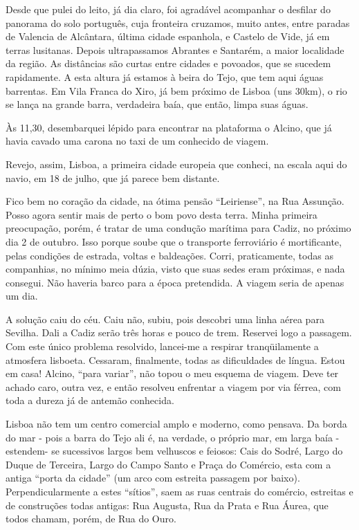 Desde que pulei do leito, já dia claro, foi agradável acompanhar o desfilar do panorama do solo português, cuja fronteira cruzamos, muito antes, entre paradas de Valencia de Alcântara, última cidade espanhola, e Castelo de Vide, já em terras lusitanas. Depois ultrapassamos Abrantes e Santarém, a maior localidade da região. As distâncias são curtas entre cidades e povoados, que se sucedem rapidamente. A esta altura já estamos à beira do Tejo, que tem aqui águas barrentas. Em Vila Franca do Xiro, já bem próximo de Lisboa (uns 30km), o rio se lança na grande barra, verdadeira baía, que então, limpa suas águas.

Às 11,30, desembarquei lépido para encontrar na plataforma o Alcino, que já havia cavado uma carona no taxi de um conhecido de viagem.

Revejo, assim, Lisboa, a primeira cidade europeia que conheci, na escala aqui do navio, em 18 de julho, que já parece bem distante.

Fico bem no coração da cidade, na ótima pensão “Leiriense”, na Rua Assunção. Posso agora sentir mais de perto o bom povo desta terra. Minha primeira preocupação, porém, é tratar de uma condução marítima para Cadiz, no próximo dia 2 de outubro. Isso porque soube que o transporte ferroviário é mortificante, pelas condições de estrada, voltas e baldeações. Corri, praticamente, todas as companhias, no mínimo meia dúzia, visto que suas sedes eram próximas, e nada consegui. Não haveria barco para a época pretendida. A viagem seria de apenas um dia.

A solução caiu do céu. Caiu não, subiu, pois descobri uma linha aérea para Sevilha. Dali a Cadiz serão três horas e pouco de trem. Reservei logo a passagem. Com este único problema resolvido, lancei-me a respirar tranqüilamente a atmosfera lisboeta. Cessaram, finalmente, todas as dificuldades de língua. Estou em casa! Alcino, “para variar”, não topou o meu esquema de viagem. Deve ter achado caro, outra vez, e então resolveu enfrentar a viagem por via férrea, com toda a dureza já de antemão conhecida.

Lisboa não tem um centro comercial amplo e moderno, como pensava. Da borda do mar - pois a barra do Tejo ali é, na verdade, o próprio mar, em larga baía - estendem- se sucessivos largos bem velhuscos e feiosos: Cais do Sodré, Largo do Duque de Terceira, Largo do Campo Santo e Praça do Comércio, esta com a antiga “porta da cidade” (um arco com estreita passagem por baixo). Perpendicularmente a estes “sítios”, saem as ruas centrais do comércio, estreitas e de construções todas antigas: Rua Augusta, Rua da Prata e Rua Áurea, que todos chamam, porém, de Rua do Ouro.

